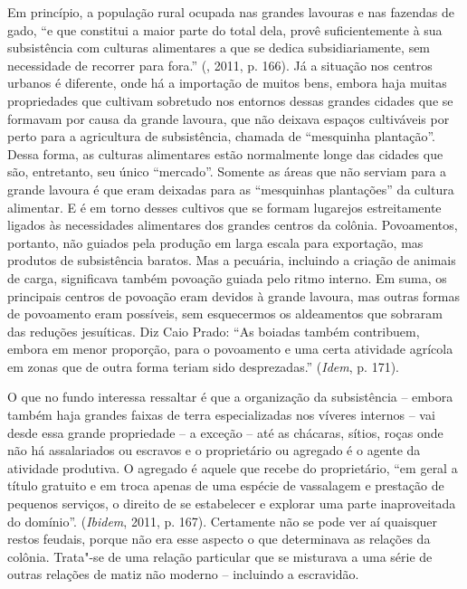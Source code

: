 {Em princípio, a população rural ocupada nas grandes lavouras e nas
fazendas de gado, ``e que constitui a maior parte do total dela, provê
suficientemente à sua subsistência com culturas alimentares a que se
dedica subsidiariamente, sem necessidade de recorrer para fora.''
(, 2011, p. 166). Já a situação nos centros urbanos é diferente,
onde há a importação de muitos bens, embora haja muitas propriedades que
cultivam sobretudo nos entornos dessas grandes cidades que se formavam
por causa da grande lavoura, que não deixava espaços cultiváveis por
perto para a agricultura de subsistência, chamada de ``mesquinha
plantação''. Dessa forma, as culturas alimentares estão normalmente
longe das cidades que são, entretanto, seu único ``mercado''. Somente as
áreas que não serviam para a grande lavoura é que eram deixadas para as
``mesquinhas plantações'' da cultura alimentar. E é em torno desses
cultivos que se formam lugarejos estreitamente ligados às necessidades
alimentares dos grandes centros da colônia. Povoamentos, portanto, não
guiados pela produção em larga escala para exportação, mas produtos de
subsistência baratos. Mas a pecuária, incluindo a criação de
animais de carga, significava também povoação guiada pelo ritmo interno.
Em suma, os principais centros de povoação eram devidos à grande
lavoura, mas outras formas de povoamento eram possíveis, sem esquecermos
os aldeamentos que sobraram das reduções jesuíticas. Diz Caio Prado:
``As boiadas também contribuem, embora em menor proporção, para o
povoamento e uma certa atividade agrícola em zonas que de outra forma
teriam sido desprezadas.'' (\emph{Idem}, p. 171).

O que no fundo interessa ressaltar é que a organização da subsistência
-- embora também haja grandes faixas de terra especializadas nos víveres
internos -- vai desde essa grande propriedade -- a exceção -- até as
chácaras, sítios, roças onde não há assalariados ou escravos e o
proprietário ou agregado é o agente da atividade produtiva.
O agregado é aquele que recebe
do proprietário, ``em geral a título gratuito e em troca apenas de uma
espécie de vassalagem e prestação de pequenos serviços, o direito de se
estabelecer e explorar uma parte inaproveitada do domínio''.
(\emph{Ibidem}, 2011, p. 167). Certamente não se pode ver aí quaisquer
restos feudais, porque não era esse aspecto o que determinava as
relações da colônia. Trata"-se de uma relação particular que se misturava
a uma série de outras relações de matiz não moderno -- incluindo a
escravidão.

}
